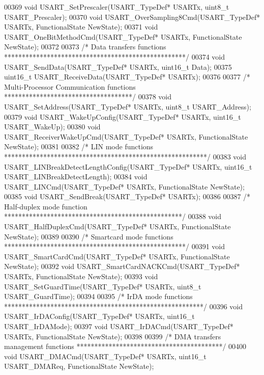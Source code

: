 \begin{DoxyCode}
00369 \textcolor{keywordtype}{void} USART_SetPrescaler(USART\_TypeDef* USARTx, uint8\_t USART\_Prescaler);
00370 \textcolor{keywordtype}{void} USART_OverSampling8Cmd(USART\_TypeDef* USARTx, FunctionalState NewState);
00371 \textcolor{keywordtype}{void} USART_OneBitMethodCmd(USART\_TypeDef* USARTx, FunctionalState NewState);
00372 
00373 \textcolor{comment}{/* Data transfers functions ***************************************************/}
00374 \textcolor{keywordtype}{void} USART_SendData(USART\_TypeDef* USARTx, uint16\_t Data);
00375 uint16\_t USART_ReceiveData(USART\_TypeDef* USARTx);
00376 
00377 \textcolor{comment}{/* Multi-Processor Communication functions ************************************/}
00378 \textcolor{keywordtype}{void} USART_SetAddress(USART\_TypeDef* USARTx, uint8\_t USART\_Address);
00379 \textcolor{keywordtype}{void} USART_WakeUpConfig(USART\_TypeDef* USARTx, uint16\_t USART\_WakeUp);
00380 \textcolor{keywordtype}{void} USART_ReceiverWakeUpCmd(USART\_TypeDef* USARTx, FunctionalState NewState);
00381 
00382 \textcolor{comment}{/* LIN mode functions *********************************************************/}
00383 \textcolor{keywordtype}{void} USART_LINBreakDetectLengthConfig(USART\_TypeDef* USARTx, uint16\_t USART\_LINBreakDetectLength);
00384 \textcolor{keywordtype}{void} USART_LINCmd(USART\_TypeDef* USARTx, FunctionalState NewState);
00385 \textcolor{keywordtype}{void} USART_SendBreak(USART\_TypeDef* USARTx);
00386 
00387 \textcolor{comment}{/* Half-duplex mode function **************************************************/}
00388 \textcolor{keywordtype}{void} USART_HalfDuplexCmd(USART\_TypeDef* USARTx, FunctionalState NewState);
00389 
00390 \textcolor{comment}{/* Smartcard mode functions ***************************************************/}
00391 \textcolor{keywordtype}{void} USART_SmartCardCmd(USART\_TypeDef* USARTx, FunctionalState NewState);
00392 \textcolor{keywordtype}{void} USART_SmartCardNACKCmd(USART\_TypeDef* USARTx, FunctionalState NewState);
00393 \textcolor{keywordtype}{void} USART_SetGuardTime(USART\_TypeDef* USARTx, uint8\_t USART\_GuardTime);
00394 
00395 \textcolor{comment}{/* IrDA mode functions ********************************************************/}
00396 \textcolor{keywordtype}{void} USART_IrDAConfig(USART\_TypeDef* USARTx, uint16\_t USART\_IrDAMode);
00397 \textcolor{keywordtype}{void} USART_IrDACmd(USART\_TypeDef* USARTx, FunctionalState NewState);
00398 
00399 \textcolor{comment}{/* DMA transfers management functions *****************************************/}
00400 \textcolor{keywordtype}{void} USART_DMACmd(USART\_TypeDef* USARTx, uint16\_t USART\_DMAReq, FunctionalState NewState);

\end{DoxyCode}

